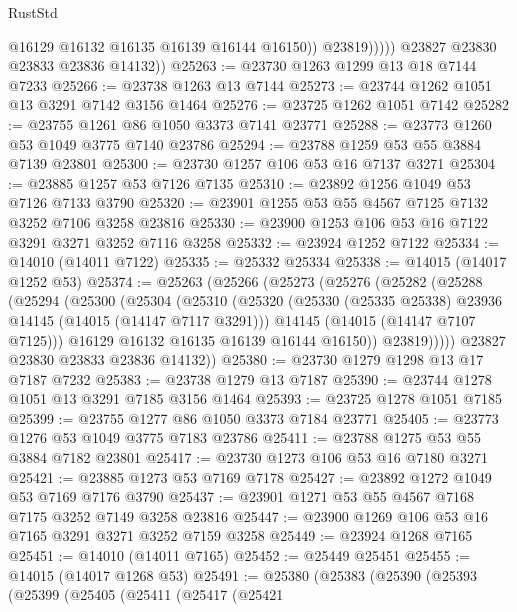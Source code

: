 \begin{lexlean}{RustStd}
\begin{coremodule}
                      @16129
                      @16132
                      @16135
                      @16139
                      @16144
                      @16150))
                  @23819)))))
        @23827
        @23830
        @23833
        @23836
        @14132))
@25263 := @23730 @1263 @1299 @13 @18 @7144 @7233
@25266 := @23738 @1263 @13 @7144
@25273 := @23744 @1262 @1051 @13 @3291 @7142 @3156 @1464
@25276 := @23725 @1262 @1051 @7142
@25282 := @23755 @1261 @86 @1050 @3373 @7141 @23771
@25288 := @23773 @1260 @53 @1049 @3775 @7140 @23786
@25294 := @23788 @1259 @53 @55 @3884 @7139 @23801
@25300 := @23730 @1257 @106 @53 @16 @7137 @3271
@25304 := @23885 @1257 @53 @7126 @7135
@25310 := @23892 @1256 @1049 @53 @7126 @7133 @3790
@25320 := @23901 @1255 @53 @55 @4567 @7125 @7132 @3252 @7106 @3258 @23816
@25330 := @23900 @1253 @106 @53 @16 @7122 @3291 @3271 @3252 @7116 @3258
@25332 := @23924 @1252 @7122
@25334 := @14010 (@14011 @7122)
@25335 := @25332 @25334
@25338 := @14015 (@14017 @1252 @53)
@25374 := @25263
    (@25266
      (@25273
        (@25276
          (@25282
            (@25288
              (@25294
                (@25300
                  (@25304
                    (@25310
                      (@25320
                        (@25330 (@25335 @25338) @23936 @14145 (@14015 (@14147 @7117 @3291)))
                        @14145
                        (@14015 (@14147 @7107 @7125)))
                      @16129
                      @16132
                      @16135
                      @16139
                      @16144
                      @16150))
                  @23819)))))
        @23827
        @23830
        @23833
        @23836
        @14132))
@25380 := @23730 @1279 @1298 @13 @17 @7187 @7232
@25383 := @23738 @1279 @13 @7187
@25390 := @23744 @1278 @1051 @13 @3291 @7185 @3156 @1464
@25393 := @23725 @1278 @1051 @7185
@25399 := @23755 @1277 @86 @1050 @3373 @7184 @23771
@25405 := @23773 @1276 @53 @1049 @3775 @7183 @23786
@25411 := @23788 @1275 @53 @55 @3884 @7182 @23801
@25417 := @23730 @1273 @106 @53 @16 @7180 @3271
@25421 := @23885 @1273 @53 @7169 @7178
@25427 := @23892 @1272 @1049 @53 @7169 @7176 @3790
@25437 := @23901 @1271 @53 @55 @4567 @7168 @7175 @3252 @7149 @3258 @23816
@25447 := @23900 @1269 @106 @53 @16 @7165 @3291 @3271 @3252 @7159 @3258
@25449 := @23924 @1268 @7165
@25451 := @14010 (@14011 @7165)
@25452 := @25449 @25451
@25455 := @14015 (@14017 @1268 @53)
@25491 := @25380
    (@25383
      (@25390
        (@25393
          (@25399
            (@25405
              (@25411
                (@25417
                  (@25421

\end{coremodule}
\end{lexlean}
